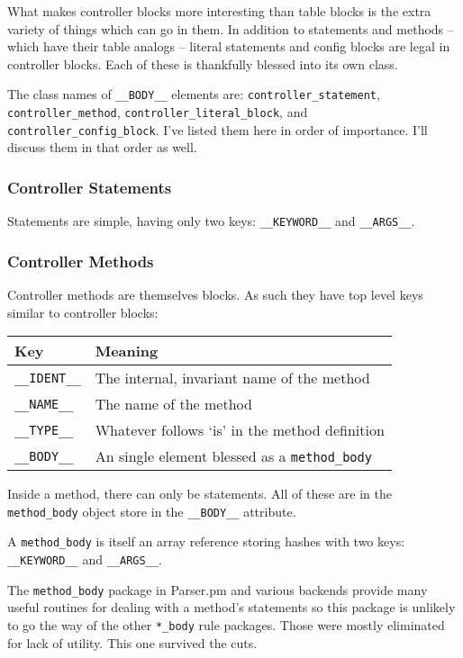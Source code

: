 What makes controller blocks more interesting than table blocks is the
extra variety of things which can go in them.  In addition to statements
and methods -- which have their table analogs -- literal statements
and config blocks are legal in controller blocks.  Each of these
is thankfully blessed into its own class.

The class names of \verb+__BODY__+ elements are: \verb+controller_statement+,
\verb+controller_method+, \verb+controller_literal_block+, and
\verb+controller_config_block+.  I've listed them here in order of
importance.  I'll discuss them in that order as well.

\subsubsection*{Controller Statements}

Statements are simple, having only two keys: \verb+__KEYWORD__+ and
\verb+__ARGS__+.

\subsubsection*{Controller Methods}

Controller methods are themselves blocks.  As such they have top level
keys similar to controller blocks:

\begin{tabular}{l|l}
Key              & Meaning                                             \\
\hline
\verb+__IDENT__+ & The internal, invariant name of the method          \\
\verb+__NAME__+  & The name of the method                              \\
\verb+__TYPE__+  & Whatever follows `is' in the method definition      \\
\verb+__BODY__+  & An single element blessed as a \verb+method_body+   \\
\end{tabular}

Inside a method, there can only be statements.  All of these are in
the \verb+method_body+ object store in the \verb+__BODY__+ attribute.

A \verb+method_body+ is itself an array reference storing hashes with
two keys: \verb+__KEYWORD__+ and \verb+__ARGS__+.

The \verb+method_body+ package in Parser.pm and various backends provide
many useful routines for dealing with a method's statements so this
package is unlikely to go the way of the other \verb+*_body+ rule packages.
Those were mostly eliminated for lack of utility.  This one survived the cuts.

